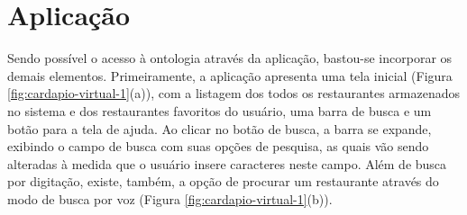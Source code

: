 \begin{figure}[H]
	\qquad
\end{figure}

\section{Aplicação}

Sendo possível o acesso à ontologia através da aplicação, bastou-se incorporar os demais elementos. Primeiramente, a aplicação apresenta uma tela inicial (Figura \ref{fig:cardapio-virtual-1}(a)), com a listagem dos todos os restaurantes armazenados no sistema e dos restaurantes favoritos do usuário, uma barra de busca e um botão para a tela de ajuda. Ao clicar no botão de busca, a barra se expande, exibindo o campo de busca com suas opções de pesquisa, as quais vão sendo alteradas à medida que o usuário insere caracteres neste campo. Além de busca por digitação, existe, também, a opção de procurar um restaurante através do modo de busca por voz (Figura \ref{fig:cardapio-virtual-1}(b)).

